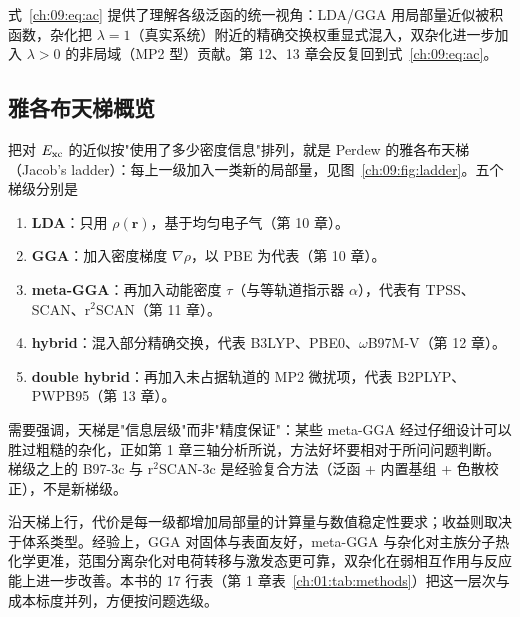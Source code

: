 式~\eqref{ch:09:eq:ac} 提供了理解各级泛函的统一视角：LDA/GGA 用局部量近似被积函数，杂化把 $\lambda = 1$（真实系统）附近的精确交换权重显式混入，双杂化进一步加入 $\lambda > 0$ 的非局域（MP2 型）贡献。第 12、13 章会反复回到式~\eqref{ch:09:eq:ac}。

\subsection{雅各布天梯概览}
\label{ch:09:sec:ladder}

把对 $E_{\mathrm{xc}}$ 的近似按"使用了多少密度信息"排列，就是 Perdew 的雅各布天梯（Jacob's ladder）\citep{burke2012}：每上一级加入一类新的局部量，见图~\ref{ch:09:fig:ladder}。五个梯级分别是

\begin{enumerate}
  \item \textbf{LDA}：只用 $\rho(\mathbf{r})$，基于均匀电子气\citep{vosko1980}（第 10 章）。
  \item \textbf{GGA}：加入密度梯度 $\nabla\rho$，以 PBE 为代表\citep{perdew1996pbe}（第 10 章）。
  \item \textbf{meta-GGA}：再加入动能密度 $\tau$（与等轨道指示器 $\alpha$），代表有 TPSS\citep{tao2003}、SCAN\citep{sun2015scan}、r$^2$SCAN\citep{furness2020r2scan}（第 11 章）。
  \item \textbf{hybrid}：混入部分精确交换，代表 B3LYP\citep{becke1993b3lyp,lee1988}、PBE0\citep{adamo1999pbe0}、$\omega$B97M-V\citep{mardirossian2016wb97mv}（第 12 章）。
  \item \textbf{double hybrid}：再加入未占据轨道的 MP2 微扰项，代表 B2PLYP\citep{grimme2006b2plyp}、PWPB95\citep{goerigk2011pwpb95}（第 13 章）。
\end{enumerate}

需要强调，天梯是"信息层级"而非"精度保证"：某些 meta-GGA 经过仔细设计可以胜过粗糙的杂化，正如第 1 章三轴分析所说，方法好坏要相对于所问问题判断。梯级之上的 B97-3c\citep{brandenburg2018b973c} 与 r$^2$SCAN-3c\citep{grimme2021r2scan3c} 是经验复合方法（泛函 + 内置基组 + 色散校正），不是新梯级。

沿天梯上行，代价是每一级都增加局部量的计算量与数值稳定性要求；收益则取决于体系类型。经验上，GGA 对固体与表面友好，meta-GGA 与杂化对主族分子热化学更准，范围分离杂化对电荷转移与激发态更可靠，双杂化在弱相互作用与反应能上进一步改善。本书的 17 行表（第 1 章表~\ref{ch:01:tab:methods}）把这一层次与成本标度并列，方便按问题选级。

